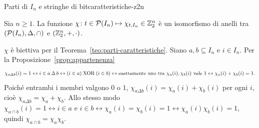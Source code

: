 \begin{concetto}
\begin{Teorema}{Parti di $I_n$ e stringhe di bit}{caratteristiche-z2n}
    \begin{prerequisiti}
    \end{prerequisiti}
    Sia $n \geq 1$. La funzione $\chi \colon t \in \mathcal{P}(I_n) \mapsto \chi_{t, I_n} \in \mathbb{Z}_2^n$ è un isomorfismo di anelli tra $(\mathcal{P}(I_n), \Delta, \cap)$ e $(\mathbb{Z}_2^n, +, \cdot)$.
\end{Teorema}
\begin{dimostrazione}
    $\chi$ è biettiva per il Teorema~\ref{teo:parti-caratteristiche}. Siano $a, b \subseteq I_n$ e $i \in I_n$. Per la Proposizione~\ref{prop:appartenenza}
    \[ \chi_{a \Delta b}(i) = 1 \leftrightarrow i \in a \,\Delta\, b \leftrightarrow (i \in a) \mathbin{\mathrm{XOR}} (i \in b) \leftrightarrow \text{esattamente uno tra } \chi_a(i), \chi_b(i) \text{ vale } 1 \leftrightarrow \chi_a(i) + \chi_b(i) = 1. \]
    Poiché entrambi i membri valgono $0$ o $1$, $\chi_{a \Delta b}(i) = \chi_a(i) + \chi_b(i)$ per ogni $i$, cioè $\chi_{a \Delta b} = \chi_a + \chi_b$. Allo stesso modo
    $\chi_{a \cap b}(i) = 1 \leftrightarrow i \in a \text{ e } i \in b \leftrightarrow \chi_a(i) = \chi_b(i) = 1 \leftrightarrow \chi_a(i)\chi_b(i) = 1$, quindi $\chi_{a \cap b} = \chi_a \chi_b$.
\end{dimostrazione}
\end{concetto}

